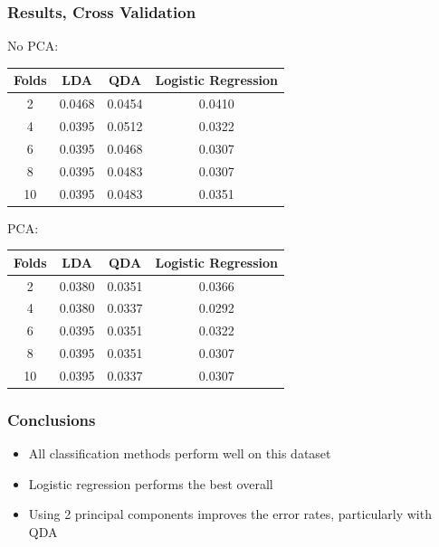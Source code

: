 \documentclass[10pt]{beamer}
\begin{document}
\begin{frame}\frametitle{Results, Cross Validation}
  \begin{center}
    No PCA:
    \begin{tabular}{c|ccc}
      \toprule
      Folds & LDA & QDA & Logistic Regression \\
      \midrule
      2 & 0.0468 & 0.0454 & 0.0410 \\
      4 & 0.0395 & 0.0512 & 0.0322 \\
      6 & 0.0395 & 0.0468 & 0.0307 \\
      8 & 0.0395 & 0.0483 & 0.0307 \\
     10 & 0.0395 & 0.0483 & 0.0351 \\
      \bottomrule
    \end{tabular}

    \vspace{10pt}
    
    PCA:
    \begin{tabular}{c|ccc}
      \toprule
      Folds & LDA & QDA & Logistic Regression \\
      \midrule
      2 & 0.0380 & 0.0351 & 0.0366 \\
      4 & 0.0380 & 0.0337 & 0.0292 \\
      6 & 0.0395 & 0.0351 & 0.0322 \\
      8 & 0.0395 & 0.0351 & 0.0307 \\
     10 & 0.0395 & 0.0337 & 0.0307 \\
      \bottomrule
    \end{tabular}
  \end{center} 
\end{frame}

\begin{frame}\frametitle{Conclusions}
  \begin{itemize}
    \item All classification methods perform well on this dataset
    \item Logistic regression performs the best overall
    \item Using 2 principal components improves the error rates, particularly with QDA
  \end{itemize}
\end{frame}
\end{document}
